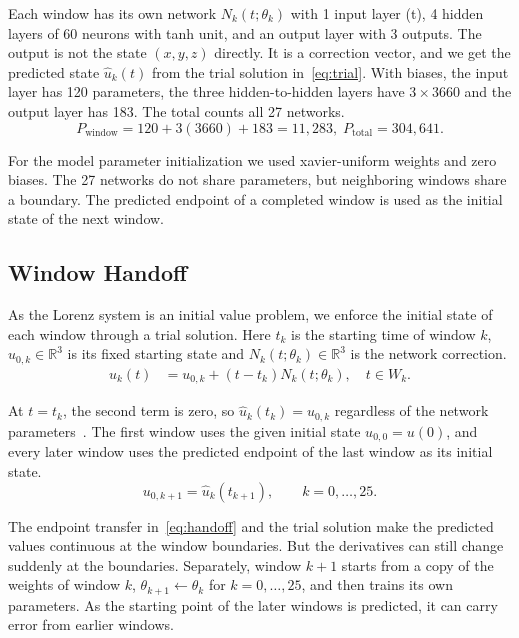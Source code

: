 \documentclass[conference]{IEEEtran}
\begin{document}
Each window has its own network $N_k(t;\theta_k)$ with 1 input layer (t), 4 hidden layers of 60 neurons with tanh unit, and an output layer with 3 outputs. The output is not the state $(x,y,z)$ directly. It is a correction vector, and we get the predicted state $\hat{u}_k(t)$ from the trial solution in~\eqref{eq:trial}. With biases, the input layer has 120 parameters, the three hidden-to-hidden layers have $3\times3660$ and the output layer has 183. The total counts all 27 networks.
\[
P_{\mathrm{window}}=120+3(3660)+183=11{,}283,\; P_{\mathrm{total}}=304{,}641.
\]

For the model parameter initialization we used xavier-uniform weights and zero biases. The 27 networks do not share parameters, but neighboring windows share a boundary. The predicted endpoint of a completed window is used as the initial state of the next window. 

\subsection{Window Handoff}
As the Lorenz system is an initial value problem, we enforce the initial state of each window through a trial solution. Here $t_k$ is the starting time of window $k$, $u_{0,k}\in\mathbb{R}^3$ is its fixed starting state and $N_k(t;\theta_k)\in\mathbb{R}^3$ is the network correction.
\begin{equation}
\begin{aligned}
\hat{u}_k(t)
  &=u_{0,k}+(t-t_k)N_k(t;\theta_k),\quad t\in W_k.
\end{aligned}
\label{eq:trial}
\end{equation}



At $t=t_k$, the second term is zero, so $\hat{u}_k(t_k)=u_{0,k}$ regardless of the network parameters~\cite{lagaris1998}. The first window uses the given initial state $u_{0,0}=u(0)$, and every later window uses the predicted endpoint of the last window as its initial state.
\begin{equation}
u_{0,k+1}=\hat{u}_k(t_{k+1}), \qquad k=0,\ldots,25.
\label{eq:handoff}
\end{equation}

The endpoint transfer in~\eqref{eq:handoff} and the trial solution make the predicted values continuous at the window boundaries. But the derivatives can still change suddenly at the boundaries. Separately, window $k+1$ starts from a copy of the weights of window $k$, $\theta_{k+1}\leftarrow\theta_k$ for $k=0,\ldots,25$, and then trains its own parameters. As the starting point of the later windows is predicted, it can carry error from earlier windows.
\end{document}
